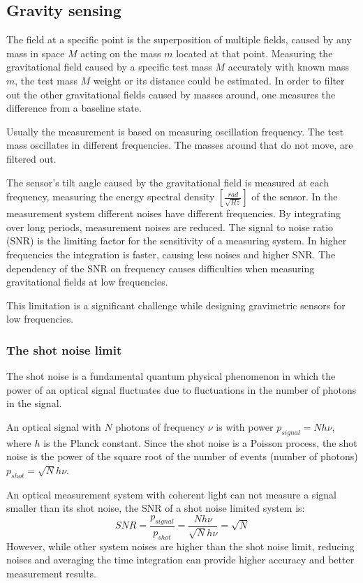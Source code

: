 \documentclass[\main/master.tex]{subfiles}
\begin{document}
\subsection{Gravity sensing}
The field at a specific point is the superposition of multiple fields, caused by any mass in space $M$ acting on the mass $m$ located at that point. Measuring the gravitational field caused by a specific test mass $M$ accurately with known mass $m$, the test mass $M$ weight or its distance could be estimated. In order to filter out the other gravitational fields caused by masses around, one measures the difference from a baseline state.
\par\noindent
Usually the measurement is based on measuring oscillation frequency. The test mass oscillates in different frequencies. The masses around that do not move, are filtered out.
\par\noindent
The sensor's tilt angle caused by the gravitational field is measured at each frequency, measuring the energy spectral density $[\frac{rad}{\sqrt{Hz}}]$ of the sensor.
In the measurement system different noises have different frequencies. By integrating over long periods, measurement noises are reduced. The signal to noise ratio (SNR) is the limiting factor for the sensitivity of a measuring system. In higher frequencies the integration is faster, causing less noises and higher SNR.
The dependency of the SNR on frequency causes difficulties when measuring gravitational fields at low frequencies.
\par\noindent
This limitation is a significant challenge while designing gravimetric sensors for low frequencies.

\subsubsection{The shot noise limit}
The shot noise is a fundamental quantum physical phenomenon in which the power of an optical signal fluctuates due to fluctuations in the number of photons in the signal. 
\par\noindent
An optical signal with $N$ photons of frequency $\nu$ is with power $p_{signal} = N h \nu$, where $h$ is the Planck constant. Since the shot noise is a Poisson process, the shot noise is the power of the square root of the number of events (number of photons) $p_{shot} = \sqrt{N} h \nu$.
\par\noindent
An optical measurement system with coherent light can not measure a signal smaller than its shot noise, the SNR of a shot noise limited system is:
\begin{equation}
SNR = \frac{p_{signal}}{p_{shot}} =\frac{N h \nu}{\sqrt{N} h \nu} = \sqrt{N}    \label{eqn:shot_noise}
\end{equation}
However, while other system noises are higher than the shot noise limit, reducing noises and averaging the time integration can provide higher accuracy and better measurement results. 
\end{document}
